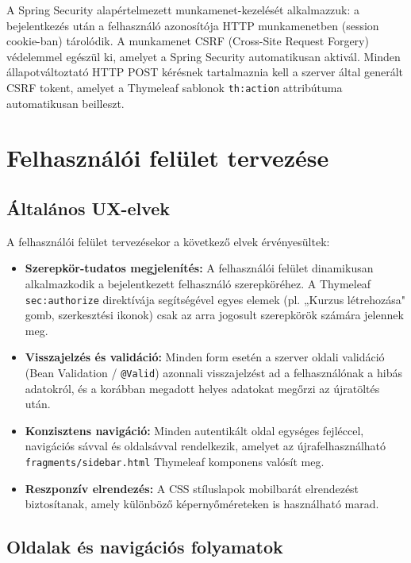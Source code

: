 A Spring Security alapértelmezett munkamenet-kezelését alkalmazzuk: a bejelentkezés után a felhasználó azonosítója HTTP munkamenetben (session cookie-ban) tárolódik. A munkamenet CSRF (Cross-Site Request Forgery) védelemmel egészül ki, amelyet a Spring Security automatikusan aktivál. Minden állapotváltoztató HTTP POST kérésnek tartalmaznia kell a szerver által generált CSRF tokent, amelyet a Thymeleaf sablonok \texttt{th:action} attribútuma automatikusan beilleszt.

\section{Felhasználói felület tervezése}

\subsection{Általános UX-elvek}

A felhasználói felület tervezésekor a következő elvek érvényesültek:

\begin{itemize}
    \item \textbf{Szerepkör-tudatos megjelenítés:} A felhasználói felület dinamikusan alkalmazkodik a bejelentkezett felhasználó szerepköréhez. A Thymeleaf \texttt{sec:authorize} direktívája segítségével egyes elemek (pl. „Kurzus létrehozása" gomb, szerkesztési ikonok) csak az arra jogosult szerepkörök számára jelennek meg.
    \item \textbf{Visszajelzés és validáció:} Minden form esetén a szerver oldali validáció (Bean Validation / \texttt{@Valid}) azonnali visszajelzést ad a felhasználónak a hibás adatokról, és a korábban megadott helyes adatokat megőrzi az újratöltés után.
    \item \textbf{Konzisztens navigáció:} Minden autentikált oldal egységes fejléccel, navigációs sávval és oldalsávval rendelkezik, amelyet az újrafelhasználható \texttt{fragments/sidebar.html} Thymeleaf komponens valósít meg.
    \item \textbf{Reszponzív elrendezés:} A CSS stíluslapok mobilbarát elrendezést biztosítanak, amely különböző képernyőméreteken is használható marad.
\end{itemize}

\subsection{Oldalak és navigációs folyamatok}

